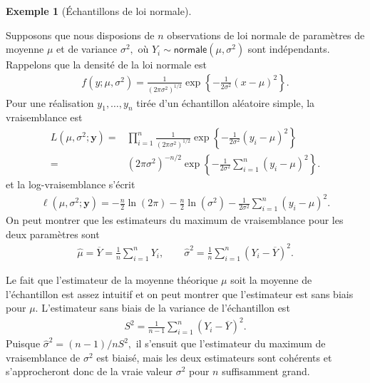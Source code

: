 \documentclass[
  11pt,
  letterpaper,
]{scrbook}
\theoremstyle{plain}
\theoremstyle{plain}
\theoremstyle{definition}
\newtheorem{example}{Exemple}[chapter]
\theoremstyle{definition}
\theoremstyle{remark}
\begin{document}
\begin{example}[Échantillons de loi
normale]\protect\hypertarget{exm-emv-normal}{}\label{exm-emv-normal}

Supposons que nous disposions de \(n\) observations de loi normale de
paramètres de moyenne \(\mu\) et de variance \(\sigma^2,\) où
\(Y_i \sim \mathsf{normale}(\mu, \sigma^2)\) sont indépendants.
Rappelons que la densité de la loi normale est \begin{align*}
f(y; \mu, \sigma^2)=\frac{1}{(2\pi \sigma^2)^{1/2}}\exp\left\{-\frac{1}{2\sigma^2}(x-\mu)^2\right\}.
\end{align*} Pour une réalisation \(y_1, \ldots, y_n\) tirée d'un
échantillon aléatoire simple, la vraisemblance est \begin{align*}
L(\mu, \sigma^2; \boldsymbol{y})=&\prod_{i=1}^n\frac{1}{({2\pi \sigma^2})^{1/2}}\exp\left\{-\frac{1}{2\sigma^2}(y_i-\mu)^2\right\}\\
=&(2\pi \sigma^2)^{-n/2}\exp\left\{-\frac{1}{2\sigma^2}\sum_{i=1}^n(y_i-\mu)^2\right\}.
\end{align*} et la log-vraisemblance s'écrit \begin{align*}
\ell(\mu, \sigma^2; \boldsymbol{y})=-\frac{n}{2}\ln(2\pi) -\frac{n}{2}\ln(\sigma^2)-\frac{1}{2\sigma^2}\sum_{i=1}^n (y_i-\mu)^2.
\end{align*} On peut montrer que les estimateurs du maximum de
vraisemblance pour les deux paramètres sont \begin{align*}
\widehat{\mu}=\overline{Y}=\frac{1}{n} \sum_{i=1}^n Y_i, \qquad \widehat{\sigma}^2=\frac{1}{n}\sum_{i=1}^n (Y_i-\overline{Y})^2.
\end{align*}

Le fait que l'estimateur de la moyenne théorique \(\mu\) soit la moyenne
de l'échantillon est assez intuitif et on peut montrer que l'estimateur
est sans biais pour \(\mu.\) L'estimateur sans biais de la variance de
l'échantillon est \begin{align*}
S^2=\frac{1}{n-1} \sum_{i=1}^n (Y_i-\overline{Y})^2.
\end{align*} Puisque \(\widehat{\sigma}^2=(n-1)/n S^2,\) il s'ensuit que
l'estimateur du maximum de vraisemblance de \(\sigma^2\) est biaisé,
mais les deux estimateurs sont cohérents et s'approcheront donc de la
vraie valeur \(\sigma^2\) pour \(n\) suffisamment grand.

\end{example}
\end{document}
